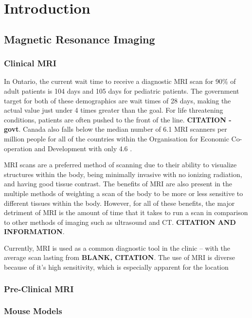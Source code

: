 \chapter{Introduction}

    \section{Magnetic Resonance Imaging}
    
        \subsection{Clinical MRI}
            
            In Ontario, the current wait time to receive a diagnostic MRI scan for 90\% of adult patients is 104 days and 105 days for pediatric patients. The government target for both of these demographics are wait times of 28 days, making the actual value just under 4 times greater than the goal. For life threatening conditions, patients are often pushed to the front of the line. \textbf{CITATION - govt}. Canada also falls below the median number of 6.1 MRI scanners per million people for all of the countries within the Organisation for Economic Co-operation and Development with only 4.6 \cite{Emery09,Stein05}.
            
            MRI scans are a preferred method of scanning due to their ability to visualize structures within the body, being minimally invasive with no ionizing radiation, and having good tissue contrast. The benefits of MRI are also present in the multiple methods of weighting a scan of the body to be more or less sensitive to different tissues within the body. However, for all of these benefits, the major detriment of MRI is the amount of time that it takes to run a scan in comparison to other methods of imaging such as ultrasound and CT. \textbf{CITATION AND INFORMATION}.
    
            Currently, MRI is used as a common diagnostic tool in the clinic -- with the average scan lasting from \textbf{BLANK, CITATION}. The use of MRI is diverse because of it's high sensitivity, which is especially apparent for the location 
            
            
        \subsection{Pre-Clinical MRI}
        
        \subsection{Mouse Models}
        
